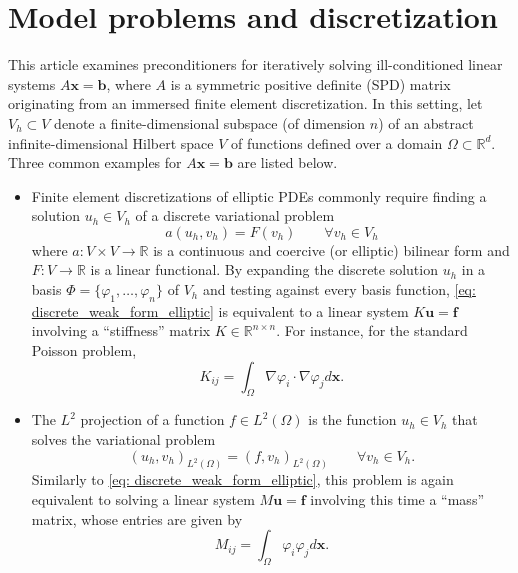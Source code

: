 \documentclass{article}
\numberwithin{equation}{section}
\newcommand{\dx}{d\bm{x}}
\theoremstyle{definition}
\begin{document}
\section{Model problems and discretization}
\label{se: model_problems}
This article examines preconditioners for iteratively solving ill-conditioned linear systems $A\bm{x}=\bm{b}$, where $A$ is a symmetric positive definite (SPD) matrix originating from an immersed finite element discretization. In this setting, let $V_h \subset V$ denote a finite-dimensional subspace (of dimension $n$) of an abstract infinite-dimensional Hilbert space $V$ of functions defined over a domain $\Omega \subset \mathbb{R}^d$. Three common examples for $A\bm{x}=\bm{b}$ are listed below.

\begin{itemize}
    \item Finite element discretizations of elliptic PDEs commonly require finding a solution $u_h \in V_h$ of a discrete variational problem
    \begin{equation}
    \label{eq: discrete_weak_form_elliptic}
        a(u_h,v_h)=F(v_h) \qquad \forall v_h \in V_h
    \end{equation}
    where $a \colon V \times V \to \mathbb{R}$ is a continuous and coercive (or elliptic) bilinear form and $F \colon V \to \mathbb{R}$ is a linear functional. By expanding the discrete solution $u_h$ in a basis $\Phi=\{\varphi_1,\dots,\varphi_n\}$ of $V_h$ and testing against every basis function, \eqref{eq: discrete_weak_form_elliptic} is equivalent to a linear system $K\bm{u}=\bm{f}$ involving a ``stiffness'' matrix $K \in \mathbb{R}^{n \times n}$. For instance, for the standard Poisson problem, 
    \begin{equation*}
        K_{ij} = \int_{\Omega} \nabla \varphi_i \cdot \nabla \varphi_j \dx.
    \end{equation*}
    \item The $L^2$ projection of a function $f \in L^2(\Omega)$ is the function $u_h \in V_h$ that solves the variational problem
    \begin{equation}
    \label{eq: L^2_projection}
    (u_h,v_h)_{L^2(\Omega)} = (f,v_h)_{L^2(\Omega)} \qquad \forall v_h \in V_h.
    \end{equation}
    Similarly to \eqref{eq: discrete_weak_form_elliptic}, this problem is again equivalent to solving a linear system $M\bm{u}=\bm{f}$ involving this time a ``mass'' matrix, whose entries are given by
    \begin{equation*}
        M_{ij} = \int_{\Omega} \varphi_i \varphi_j \dx.

\end{equation*}
\end{itemize}
\end{document}
